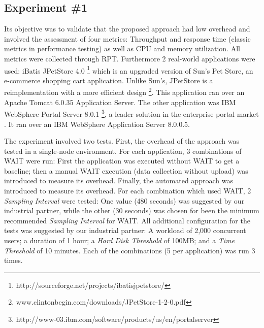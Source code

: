 \documentclass[runningheads,a4paper]{llncs}
\begin{document}
\subsection{Experiment \#1}
\vspace{-2pt}
Its objective was to validate that the proposed approach had low overhead and
involved the assessment of four metrics: Throughput and response time (classic
metrics in performance testing) as well as CPU and memory utilization. All
metrics were collected through RPT. Furthermore 2 real-world applications
were used: iBatis JPetStore 4.0
\footnote{http://sourceforge.net/projects/ibatisjpetstore/} which is an upgraded
version of Sun's Pet Store, an e-commerce shopping cart application. Unlike
Sun’s, JPetStore is a reimplementation with a more efficient design
\footnote{www.clintonbegin.com/downloads/JPetStore-1-2-0.pdf‎}. This application
ran over an Apache Tomcat 6.0.35 Application Server.
The other application was IBM WebSphere Portal Server 8.0.1 \footnote{http://www-03.ibm.com/software/products/us/en/portalserver},
a leader solution in the enterprise portal market \cite{Gartner2008}. It ran
over an IBM WebSphere Application Server 8.0.0.5.

The experiment involved two tests. First, the overhead of the approach was
tested in a single-node environment. For each application, 3 combinations
of WAIT were run: First the application was executed without WAIT to get a
baseline; then a manual WAIT execution (data collection without upload) was
introduced to measure its overhead. Finally, the automated approach was
introduced to measure its overhead. For each combination which used WAIT, 2
\emph{Sampling Interval} were tested: One value (480 seconds) was suggested by
our industrial partner, while the other (30 seconds) was chosen for been the
minimum recommended \emph{Sampling Interval} for WAIT. All additional
configuration for the tests was suggested by our industrial partner: A workload
of 2,000 concurrent users; a duration of 1 hour; a \emph{Hard Disk Threshold} of
100MB; and a \emph{Time Threshold} of 10 minutes. Each of the combinations (5
per application) was run 3 times.
\end{document}
